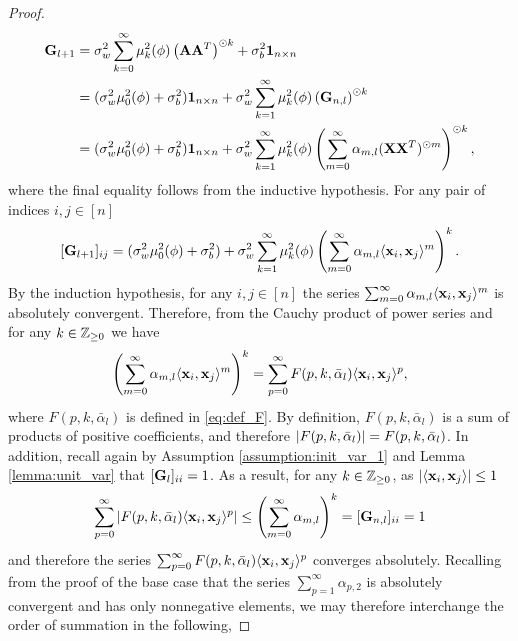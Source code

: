 \begin{proof}
    \[
    \begin{aligned}
        \mathbf{G}_{l+1}  &= \sigma_w^2 \sum_{k = 0}^{\infty} \mu_k^2(\phi) \left(\mathbf{A} \mathbf{A}^T \right)^{\odot k} + \sigma_b^2 \textbf{1}_{n\times n}\\
        &= (\sigma_w^2\mu_0^2(\phi) + \sigma_b^2) \textbf{1}_{n \times n} + \sigma_w^2\sum_{k=1}^{\infty}\mu_k^2(\phi)\left(\mathbf{G}_{n,l}\right)^{\odot k}\\
        & = (\sigma_w^2\mu_0^2(\phi) + \sigma_b^2) \textbf{1}_{n \times n} + \sigma_w^2\sum_{k=1}^{\infty}\mu_k^2(\phi)\left(\sum_{m=0}^{\infty} \alpha_{m,l}(\mathbf{X}\mathbf{X}^T)^{\odot m}\right)^{\odot k},
    \end{aligned}
    \]
    where the final equality follows from the inductive hypothesis. For any pair of indices $i,j \in [n]$
    \[
    [\mathbf{G}_{l+1}]_{ij} = (\sigma_w^2\mu_0^2(\phi) + \sigma_b^2) + \sigma_w^2\sum_{k=1}^{\infty}\mu_k^2(\phi)\left(\sum_{m=0}^{\infty} \alpha_{m,l}\langle \mathbf x_i, \mathbf x_j \rangle^m\right)^k.
    \]
     By the induction hypothesis, for any $i,j \in [n]$ the series $\sum_{m=0}^\infty\alpha_{m,l}\langle \mathbf x_i, \mathbf x_j \rangle^m$ is absolutely convergent. Therefore, from the Cauchy product of power series and for any $k \in \mathbb{Z}_{\geq 0}$ we have
     \begin{equation} \label{eq:cauchy_product}
     \left(\sum_{m=0}^{\infty} \alpha_{m,l}\langle \mathbf x_i, \mathbf x_j \rangle^m\right)^k = \sum_{p=0}^{\infty} F(p,k,\bar{\alpha}_{l}) \langle \mathbf x_i, \mathbf x_j \rangle^p,
     \end{equation}
    where $F(p,k,\bar{\alpha}_{l})$ is defined in \eqref{eq:def_F}. By definition, $F(p,k,\bar{\alpha}_{l})$ is a sum of products of positive coefficients, and therefore $\left\lvert F(p,k,\bar{\alpha}_{l})\right\rvert = F(p,k,\bar{\alpha}_{l})$. In addition, recall again by Assumption \ref{assumption:init_var_1} and Lemma \ref{lemma:unit_var} that $[\mathbf{G}_{l}]_{ii} = 1$. As a result, for any $k \in \mathbb{Z}_{\geq 0}$, as $\left\lvert\langle \mathbf x_i, \mathbf x_j \rangle\right\rvert \leq 1$
    \begin{equation}\label{eq:capitalfsumsoverp}
    \sum_{p=0}^{\infty} \left\lvert F(p,k,\bar{\alpha}_{l}) \langle \mathbf x_i, \mathbf x_j \rangle^p\right\rvert \leq \left(\sum_{m=0}^{\infty} \alpha_{m,l} \right)^k = [\mathbf{G}_{n,l}]_{ii} = 1
    \end{equation}
     and therefore the series $\sum_{p=0}^{\infty} F(p,k,\bar{\alpha}_{l})\langle \mathbf x_i, \mathbf x_j \rangle^p $ converges absolutely. Recalling from the proof of the base case that the series $\sum_{p=1}^{\infty} \alpha_{p,2}$ is absolutely convergent and has only nonnegative elements, we may therefore interchange the order of summation in the following,

\end{proof}
